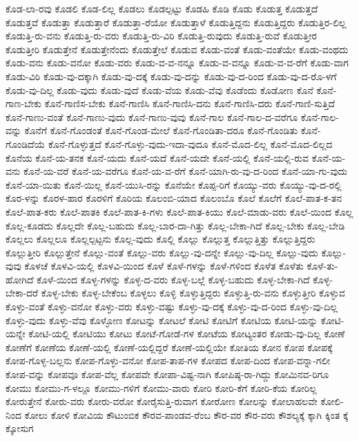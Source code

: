 {ಕೊಡ-ಲಾ-ರವು
ಕೊಡಲಿ
ಕೊಡ-ಲಿಲ್ಲ
ಕೊಡಲು
ಕೊಡಲ್ಪಟ್ಟು
ಕೊಡಹಿ
ಕೊಡಿ
ಕೊಡು
ಕೊಡುತ್ತ
ಕೊಡುತ್ತದೆ
ಕೊಡುತ್ತವೆ
ಕೊಡುತ್ತಾ
ಕೊಡುತ್ತಾರೆ
ಕೊಡುತ್ತಾ-ರೆಯೋ
ಕೊಡುತ್ತಾಳೆ
ಕೊಡುತ್ತಿದ್ದನು
ಕೊಡುತ್ತಿದ್ದರು
ಕೊಡುತ್ತಿರ-ಲಿಲ್ಲ
ಕೊಡುತ್ತಿ-ರು-ವನು
ಕೊಡುತ್ತಿ-ರು-ವರು
ಕೊಡುತ್ತಿ-ರು-ವಿರಿ
ಕೊಡುತ್ತಿ-ರುವುದು
ಕೊಡುತ್ತಿ-ರುವೆ
ಕೊಡುತ್ತೀರ
ಕೊಡುತ್ತೀರಿ
ಕೊಡುತ್ತೇನೆ
ಕೊಡುತ್ತೇನೆಂದು
ಕೊಡುತ್ತೇಲೆ
ಕೊಡುವ
ಕೊಡು-ವಂತೆ
ಕೊಡು-ವಂತೆಯೇ
ಕೊಡು-ವಂಥದು
ಕೊಡು-ವನು
ಕೊಡು-ವನೋ
ಕೊಡು-ವರು
ಕೊಡು-ವ-ವ-ನನ್ನೂ
ಕೊಡು-ವ-ವನ್ನೂ
ಕೊಡು-ವ-ವ-ರೆಗೆ
ಕೊಡು-ವಾಗ
ಕೊಡು-ವಿರಿ
ಕೊಡು-ವು-ದಕ್ಕಾಗಿ
ಕೊಡು-ವು-ದಕ್ಕೆ
ಕೊಡು-ವು-ದನ್ನು
ಕೊಡು-ವು-ದ-ರಿಂದ
ಕೊಡು-ವು-ದ-ರೊ-ಳಗೆ
ಕೊಡು-ವು-ದಿಲ್ಲ
ಕೊಡು-ವುದು
ಕೊಡು-ವುದೆ
ಕೊಡು-ವೆಯ
ಕೊಡು-ವೆವು
ಕೊಡೆಂದು
ಕೊಡೋಣ
ಕೊನೆ
ಕೊನೆ-ಗಾಣ-ಬೇಕು
ಕೊನೆ-ಗಾಣಿಸ-ಬೇಕು
ಕೊನೆ-ಗಾಣಿಸಿ
ಕೊನೆ-ಗಾಣಿಸಿ-ದನು
ಕೊನೆ-ಗಾಣಿಸಿ-ದರು
ಕೊನೆ-ಗಾಣಿ-ಸುತ್ತಿದೆ
ಕೊನೆ-ಗಾಣು-ವಂತೆ
ಕೊನೆ-ಗಾಣು-ವುದು
ಕೊನೆ-ಗಾಣು-ವುವು
ಕೊನೆ-ಗಾಲ
ಕೊನೆ-ಗಾಲ-ದ-ವರೆಗೂ
ಕೊನೆ-ಗಾಲ-ವನ್ನು
ಕೊನೆಗೆ
ಕೊನೆ-ಗೊಂಡಂತೆ
ಕೊನೆ-ಗೊಂಡ-ಮೇಲೆ
ಕೊನೆ-ಗೊಂಡಿತಾ-ದರೂ
ಕೊನೆ-ಗೊಂಡಿತು
ಕೊನೆ-ಗೊಂಡಿದೆಯೆ
ಕೊನೆ-ಗೊಳ್ಳುತ್ತದೆ
ಕೊನೆ-ಗೊಳ್ಳು-ವುದು-ಇದಾ-ವುದೂ
ಕೊನೆ-ಮೊದ-ಲಿಲ್ಲ
ಕೊನೆ-ಮೊದ-ಲಿಲ್ಲದ
ಕೊನೆಯ
ಕೊನೆ-ಯ-ತನಕ
ಕೊನೆ-ಯದು
ಕೊನೆ-ಯದೆ
ಕೊನೆ-ಯದೇ
ಕೊನೆ-ಯಲ್ಲಿ
ಕೊನೆ-ಯಲ್ಲಿ-ರುವ
ಕೊನೆ-ಯ-ವನು
ಕೊನೆ-ಯ-ವರೆ
ಕೊನೆ-ಯ-ವರೆಗೂ
ಕೊನೆ-ಯ-ವ-ರೆಗೆ
ಕೊನೆ-ಯಾಗಿ-ರು-ವು-ದ-ರಿಂದ
ಕೊನೆ-ಯಾ-ಗು-ವುದು
ಕೊನೆ-ಯಾ-ಯಿತು
ಕೊನೆ-ಯಿಲ್ಲ
ಕೊನೆ-ಯುಸಿ-ರನ್ನು
ಕೊನೆಯೇ
ಕೊಪ್ಪ-ರಿಗೆ
ಕೊಯ್ಯು-ವರು
ಕೊಯ್ಯು-ವು-ದ-ರಲ್ಲಿ
ಕೊರ-ಳನ್ನು
ಕೊರಳ-ಹಾರ
ಕೊರಳಿಗೆ
ಕೊರಿಯ
ಕೊಲಂಬಿ-ಯಾದ
ಕೊಲಂಬೊ
ಕೊಲೆ
ಕೊಲೆಗೆ
ಕೊಲೆ-ಪಾತ-ಕ-ತನ
ಕೊಲೆ-ಪಾತ-ಕರು
ಕೊಲೆ-ಪಾತಕಿ
ಕೊಲೆ-ಪಾತ-ಕಿ-ಗಳು
ಕೊಲೆ-ಪಾತ-ಕಿಯು
ಕೊಲೆ-ಮಾಡು-ವರು
ಕೊಲೆ-ಯಿಂದ
ಕೊಲ್ಲ
ಕೊಲ್ಲ-ಕೂಡದು
ಕೊಲ್ಲದೇ
ಕೊಲ್ಲ-ಬಹುದು
ಕೊಲ್ಲ-ಬಾರ-ದಾ-ಗಿತ್ತು
ಕೊಲ್ಲ-ಬೇಕಾ-ಗಿದೆ
ಕೊಲ್ಲ-ಬೇಕು
ಕೊಲ್ಲ-ಬೇಡಿ
ಕೊಲ್ಲಲು
ಕೊಲ್ಲಲೂ
ಕೊಲ್ಲಲ್ಪಟ್ಟನು
ಕೊಲ್ಲ-ವುದು
ಕೊಲ್ಲಿ
ಕೊಲ್ಲು
ಕೊಲ್ಲುತ್ತ
ಕೊಲ್ಲುತ್ತಿತ್ತು
ಕೊಲ್ಲುತ್ತಿದ್ದರು
ಕೊಲ್ಲುತ್ತೀರಿ
ಕೊಲ್ಲುತ್ತೇನೆ
ಕೊಲ್ಲು-ವಂತೆ
ಕೊಲ್ಲು-ವರು
ಕೊಲ್ಲು-ವು-ದನ್ನೇ
ಕೊಲ್ಲು-ವು-ದಿಲ್ಲ
ಕೊಲ್ಲು-ವುದು
ಕೊಲ್ಲು-ವುವು
ಕೊಳಚೆ
ಕೊಳವಿ-ಯಲ್ಲಿ
ಕೊಳವಿ-ಯಿಂದ
ಕೊಳೆ
ಕೊಳೆ-ಗಳನ್ನು
ಕೊಳೆ-ಗಳಿಂದ
ಕೊಳೆತ
ಕೊಳೆತು
ಕೊಳೆ-ತು-ಹೋಗಿದೆ
ಕೊಳೆ-ಯಿಂದ
ಕೊಳ್ಳ-ಗಳನ್ನು
ಕೊಳ್ಳ-ದ-ವರು
ಕೊಳ್ಳ-ಬಲ್ಲೆ
ಕೊಳ್ಳ-ಬಹುದು
ಕೊಳ್ಳ-ಬೇಕಾ-ಗಿದೆ
ಕೊಳ್ಳ-ಬೇಕಾ-ದರೆ
ಕೊಳ್ಳ-ಬೇಕು
ಕೊಳ್ಳ-ಬೇಕೆಂಬ
ಕೊಳ್ಳಲು
ಕೊಳ್ಳಿ
ಕೊಳ್ಳುತ್ತಿದ್ದರು
ಕೊಳ್ಳುತ್ತಿ-ರು-ವನು
ಕೊಳ್ಳುತ್ತೀರಿ
ಕೊಳ್ಳುವ
ಕೊಳ್ಳು-ವಂತೆ
ಕೊಳ್ಳು-ವನೋ
ಕೊಳ್ಳು-ವರು
ಕೊಳ್ಳು-ವಷ್ಟು
ಕೊಳ್ಳು-ವು-ದಕ್ಕೆ
ಕೊಳ್ಳು-ವು-ದ-ರಿಂದ
ಕೊಳ್ಳು-ವು-ದಿಲ್ಲ
ಕೊಳ್ಳು-ವುದು
ಕೊಳ್ಳು-ವೆವು
ಕೊಳ್ಳೋಣ
ಕೋಟನ್ನು
ಕೋಟಲೆ
ಕೋಟಿ
ಕೋಟಿಗೆ
ಕೋಟಿಯ
ಕೋಟಿ-ಯನ್ನು
ಕೋಟಿ-ಯನ್ನೇ
ಕೋಟಿ-ಯಲ್ಲಿ
ಕೋಟಿಯು
ಕೋಟು
ಕೋಟೆ-ಗೋಡೆ-ಗಳ
ಕೋಟೆಯ
ಕೋಟ್ಯಂತರ
ಕೋಡು-ವು-ದಿಲ್ಲ
ಕೋಣೆ
ಕೋಣೆಗೆ
ಕೋಣೆಯ
ಕೋಣೆ-ಯಲ್ಲಿ
ಕೋಣೆ-ಯಲ್ಲಿದ್ದರೆ
ಕೋಣೆ-ಯಲ್ಲಿಯೇ
ಕೋತಿಯ
ಕೋನ
ಕೋಪ
ಕೋಪಕ್ಕೆ
ಕೋಪ-ಗೊಳ್ಳ-ಬಲ್ಲನು
ಕೋಪ-ಗೊಳ್ಳು-ವನೋ
ಕೋಪ-ತಾಪ-ಗಳ
ಕೋಪದ
ಕೋಪ-ದಿಂದ
ಕೋಪ-ವನ್ನಾ-ಗಲೀ
ಕೋಪ-ವನ್ನು
ಕೋಪವೂ
ಕೋಪ-ವೆಲ್ಲ
ಕೋಪವೇ
ಕೋಪಾ-ವಿಷ್ಟ-ನಾಗಿ
ಕೋಪಿಷ್ಠ-ರಾ-ಗಿದ್ದು
ಕೋಮಿನವ-ರಿಗೂ
ಕೋಮು
ಕೋಮು-ಗ-ಳಲ್ಲೂ
ಕೋಮು-ಗಳಿಗೆ
ಕೋಮು-ವಾರು
ಕೋರಿ
ಕೋರಿ-ಕೆಗೆ
ಕೋರಿ-ಕೆಯ
ಕೋರಿಲ್ಲ
ಕೋರುತ್ತೇನೆ
ಕೋರು-ವರು
ಕೋರು-ವರೋ
ಕೋರೈಸುತ್ತಿ-ರುವಾಗ
ಕೋರೋಣ
ಕೋಲನ್ನು
ಕೋಲಾಹಲವೇ
ಕೋಲಿ-ನಿಂದ
ಕೋಲು
ಕೋಳಿ
ಕೋವಿಯ
ಕೌಟುಂಬಿಕ
ಕೌರವ-ಪಾಂಡವ-ರೆಂಬ
ಕೌರ-ವರ
ಕೌರ-ವರು
ಕೌಶಲ್ಯಕ್ಕೆ
ಕ್ಕಾಗಿ
ಕ್ಕಿಂತ
ಕ್ಕೆ
ಕ್ಕೋಸುಗ
}
